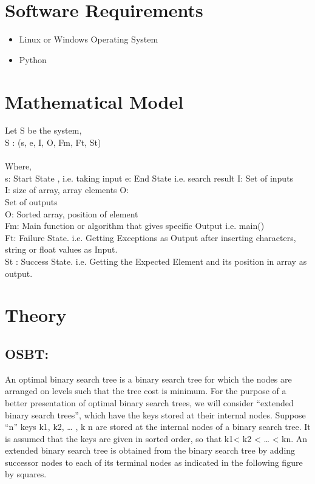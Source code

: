 \documentclass[a4paper,12pt]{article}
\begin{document}
\section{Software Requirements}
	\begin{itemize}
		\item Linux or Windows Operating System
		\item Python
	\end{itemize}
	
\section{Mathematical Model}
	Let S be the system, 	 													\\
	S : (s, e, I, O, Fm, Ft, St) 												\\\\
	Where, 	\\
	 s: Start State , i.e. taking input e: End State i.e. search result I: Set of inputs 	 														\\
	I: size of array, array elements O: 										\\
	Set of outputs 	 															\\
	O: Sorted array, position of element 										\\
	Fm: Main function or algorithm that gives specific Output i.e. main() 	 	\\
	Ft: Failure State. i.e. Getting Exceptions as Output after inserting characters, string or float values as Input. 	 							\\
	St : Success State. i.e. Getting the Expected Element and its position in array as output. 															\\
	
	
\section{Theory}
	\subsection{OSBT:} An optimal binary search tree is a binary search tree for which the nodes are arranged on levels such that the tree cost is minimum. For the purpose of a better presentation of optimal binary search trees, we will consider “extended binary search trees”, which have the keys stored at their internal nodes. Suppose “n” keys k1, k2, … , k n are stored at the internal nodes of a binary search tree. It is assumed that the keys are given in sorted order, so that k1< k2 < … < kn. An extended binary search tree is obtained from the binary search tree by adding successor nodes to each of its terminal nodes as indicated in the following figure by squares. 
	
\end{document}
